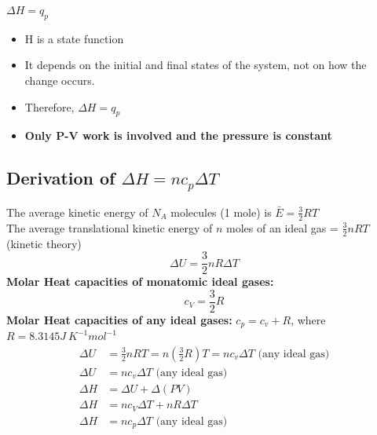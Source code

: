 \documentclass[10pt]{article}
\begin{document}
$\Delta H = q_p$\\
\begin{itemize}
    \item H is a state function
    \item It depends on the initial and final states of the system, not on how the change occurs.
    \item Therefore, $\Delta H = q_p$
    \item \textbf{Only P-V work is involved and the pressure is constant}
\end{itemize}

\subsection*{Derivation of $\Delta H = nc_p \Delta T$}
The average kinetic energy of $N_A$ molecules (1 mole) is $\bar E = \frac{3}{2} RT$\\
The average translational kinetic energy of $n$ moles of an ideal gas = $\frac{3}{2}nRT$ (kinetic theory)
\[\Delta U = \frac{3}{2}nR\Delta T\]
\textbf{Molar Heat capacities of monatomic ideal gases:}
\[c_V = \frac{3}{2}R\]
\textbf{Molar Heat capacities of any ideal gases:}
$c_p = c_v + R$, where $R = 8.3145 J\:K^{-1}mol^{-1}$
\begin{align*}
    \Delta U &= \frac{3}{2}nRT = n(\frac{3}{2}R)T = n c_v \Delta T \text{ (any ideal gas)}\\
    \Delta U &= n c_v \Delta T \text{ (any ideal gas)}\\
    \Delta H &= \Delta U + \Delta(PV)\\
    \Delta H &= n c_V \Delta T + n R\Delta T\\
    \Delta H &= n c_p \Delta T \text{ (any ideal gas)}\\
\end{align*}
\end{document}
